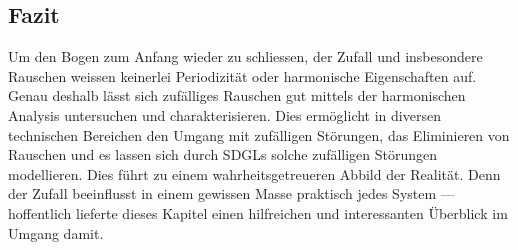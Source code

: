 \subsection{Fazit\label{brown:fazit}}

Um den Bogen zum Anfang wieder zu schliessen, der Zufall und insbesondere Rauschen weissen keinerlei Periodizität oder harmonische Eigenschaften auf. Genau deshalb lässt sich zufälliges Rauschen gut mittels der harmonischen Analysis untersuchen und charakterisieren. Dies ermöglicht in diversen technischen Bereichen den Umgang mit zufälligen Störungen, das Eliminieren von Rauschen und es lassen sich durch SDGLs solche zufälligen Störungen modellieren. Dies führt zu einem wahrheitsgetreueren Abbild der Realität. Denn der Zufall beeinflusst in einem gewissen Masse praktisch jedes System --- hoffentlich lieferte dieses Kapitel einen hilfreichen und interessanten Überblick im Umgang damit.
